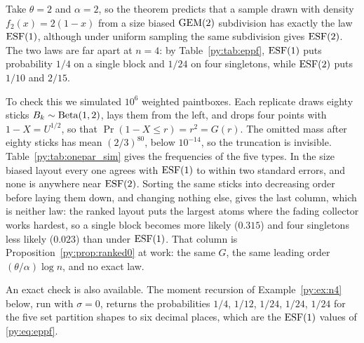 \begin{example}
\label{py:ex:onepar}
Take $\theta = 2$ and $\alpha = 2$, so the theorem predicts that a sample drawn with density
$f_2(x) = 2(1-x)$ from a size biased $\mathrm{GEM}(2)$ subdivision has exactly the law $\mathrm{ESF}(1)$, although
under uniform sampling the same subdivision gives $\mathrm{ESF}(2)$. The two laws are far apart at
$n = 4$: by Table~\ref{py:tab:eppf}, $\mathrm{ESF}(1)$ puts probability $1/4$ on a single block and
$1/24$ on four singletons, while $\mathrm{ESF}(2)$ puts $1/10$ and $2/15$.

To check this we simulated $10^{6}$ weighted paintboxes. Each replicate draws eighty sticks
$B_k \sim \mathrm{Beta}(1,2)$, lays them from the left, and drops four points with $1-X = U^{1/2}$, so that
$\Pr(1-X \le r) = r^{2} = G(r)$. The omitted mass after eighty sticks has mean $(2/3)^{80}$, below
$10^{-14}$, so the truncation is invisible. Table~\ref{py:tab:onepar_sim} gives the frequencies of
the five types. In the size biased layout every one agrees with $\mathrm{ESF}(1)$ to within two
standard errors, and none is anywhere near $\mathrm{ESF}(2)$. Sorting the same sticks into decreasing order
before laying them down, and changing nothing else, gives the last column, which is neither law:
the ranked layout puts the largest atoms where the fading collector works hardest, so a single block
becomes more likely ($0.315$) and four singletons less likely ($0.023$) than under $\mathrm{ESF}(1)$. That
column is Proposition~\ref{py:prop:ranked0} at work: the same $G$, the same leading order
$(\theta/\alpha)\log n$, and no exact law.

An exact check is also available. The moment recursion of Example~\ref{py:ex:n4} below, run with
$\sigma = 0$, returns the probabilities $1/4$, $1/12$, $1/24$, $1/24$, $1/24$ for the five set
partition shapes to six decimal places, which are the $\mathrm{ESF}(1)$ values of \eqref{py:eq:eppf}.
\end{example}


